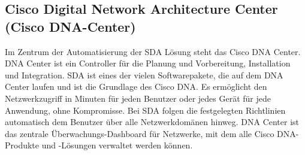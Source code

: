 \subsection{Cisco Digital Network Architecture Center (Cisco DNA-Center)}
Im Zentrum der Automatisierung der SDA Lösung steht das Cisco DNA Center. DNA Center ist ein Controller für die Planung und Vorbereitung, Installation und Integration. SDA ist eines der vielen Softwarepakete, die auf dem DNA Center laufen und ist die Grundlage des Cisco DNA. Es ermöglicht den Netzwerkzugriff in Minuten für jeden Benutzer oder jedes Gerät für jede Anwendung, ohne Kompromisse. Bei SDA folgen die festgelegten Richtlinien automatisch dem Benutzer über alle Netzwerkdomänen hinweg.
DNA Center ist das zentrale Überwachungs-Dashboard für Netzwerke, mit dem alle Cisco DNA-Produkte und -Lösungen verwaltet werden können.

